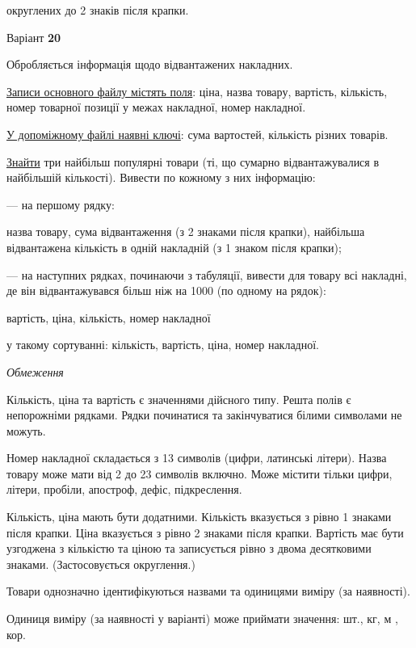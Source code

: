 \documentclass[11pt, ukrainian]{article}
\begin{document}
\bigskip
{\noindent} округлених до 2 знаків після крапки.


\par
\newpage
{\center Варіант  \No \textbf { 20 }\par}
\bigskip
Обробляється інформація щодо відвантажених накладних.

\underline{Записи основного файлу містять поля}: ціна, назва товару, вартість, кількість, номер товарної позиції у межах накладної, номер накладної.

\underline{У допоміжному файлі наявні ключі}: сума вартостей, кількість різних товарів.

\underline{Знайти} три найбільш популярні товари (ті, що сумарно відвантажувалися в найбільшій кількості). Вивести по кожному з них інформацію:\par
{\noindent}--- на першому рядку:\par
назва товару, сума відвантаження (з 2 знаками після крапки), найбільша відвантажена кількість в одній накладній (з 1 знаком після крапки);

{\noindent}--- на наступних рядках, починаючи з табуляції, вивести для товару всі накладні, де він відвантажувався більш ніж на 1000 (по одному на рядок):\par
вартість, ціна, кількість, номер накладної

{\noindent}у такому сортуванні: кількість, вартість, ціна, номер накладної.


\bigskip\textit{Обмеження}

Кількість, ціна та вартість є значеннями дійсного типу.
Решта полів є непорожніми рядками.
Рядки починатися та закінчуватися білими символами не можуть.

Номер накладної складається з 13 символів (цифри, латинські літери).
Назва товару може мати від 2 до 23 символів включно.
Може містити тільки цифри, літери, пробіли, апостроф, дефіс, підкреслення.

Кількість, ціна мають бути додатними.
Кількість вказується з рівно 1 знаками після крапки.
Ціна вказується з рівно 2 знаками після крапки.
Вартість має бути узгоджена з кількістю та ціною та записується рівно з двома десятковими знаками.
(Застосовується округлення.)

Товари однозначно ідентифікуються назвами та одиницями виміру (за наявності).

Одиниця виміру (за наявності у варіанті) може приймати значення: шт., кг, м , кор.
\end{document}
